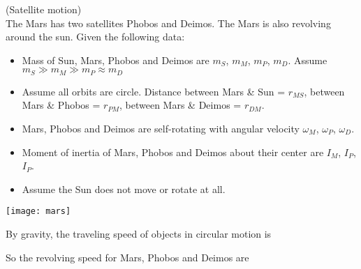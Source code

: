 \documentclass[class=article, crop=false, 12pt]{standalone}
\begin{document}
\begin{example}
    (Satellite motion)\\

    The Mars has two satellites Phobos and Deimos. The Mars is also revolving around the sun.
    Given the following data:
    \begin{itemize}
        \item Mass of Sun, Mars, Phobos and Deimos are $m_S$, $m_M$, $m_P$, $m_D$. Assume $m_S\gg m_M\gg m_P\approx m_D$
        \item Assume all orbits are circle. 
            Distance between Mars \& Sun = $r_{MS}$, between Mars \& Phobos = $r_{PM}$, between Mars \& Deimos = $r_{DM}$.
        \item Mars, Phobos and Deimos are self-rotating with angular velocity $\omega_M$, $\omega_P$, $\omega_D$.
        \item Moment of inertia of Mars, Phobos and Deimos about their center are $I_M$, $I_P$, $I_P$.
        \item Assume the Sun does not move or rotate at all.
    \end{itemize}
    
    \begin{center}
    \begin{minipage}{0.25\linewidth}
        \centering
        \texttt{[image: mars]}
    \end{minipage}
\end{center}

    By gravity, the traveling speed of objects in circular motion is

    So the revolving speed for Mars, Phobos and Deimos are 


\end{example}
\end{document}
